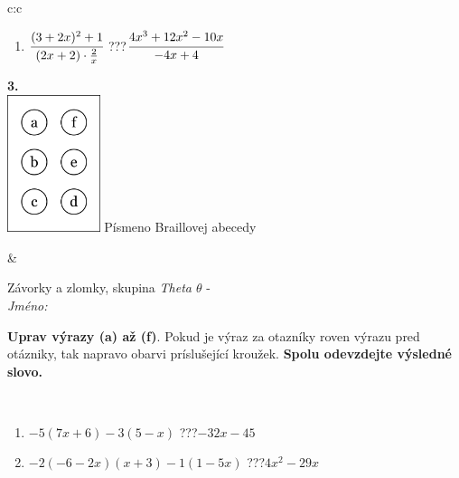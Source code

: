 \documentclass[10pt]{report}
\begin{document}
\begin{tabular}{c:c}
\begin{minipage}[c][104.5mm][t]{0.5\linewidth}
\begin{center}
\begin{minipage}{0.79\linewidth}
\begin{center}
\begin{varwidth}{\linewidth}
\begin{enumerate}
\item $\cfrac{(3+2x)^2+1}{(2x+2)\cdot\frac{2}{x}}$\quad \dotfill\; ???\;\dotfill \quad $\cfrac{4x^3+12x^2-10x}{-4x+4}$
\end{enumerate}
\end{varwidth}
\end{center}
\end{minipage}
\begin{minipage}{0.20\linewidth}
\begin{center}
{\Huge\bfseries 3.} \\[2mm]
\includegraphics[height=40mm]{../images/braille.png}
{\small Písmeno Braillovej abecedy}
\end{center}
\end{minipage}
\end{center}
\end{minipage}
&
\begin{minipage}[c][104.5mm][t]{0.5\linewidth}
\begin{center}
\vspace{7mm}
{\huge Závorky a zlomky, skupina \textit{Theta $\theta$} -}\\[5mm]
\textit{Jméno:}\phantom{xxxxxxxxxxxxxxxxxxxxxxxxxxxxxxxxxxxxxxxxxxxxxxxxxxxxxxxxxxxxxxxxx}\\[5mm]
\begin{minipage}{0.95\linewidth}
\begin{center}
\textbf{Uprav výrazy (a) až (f)}. Pokud je výraz za otazníky roven výrazu pred otázniky, tak napravo obarvi príslušející kroužek. \textbf{Spolu odevzdejte výsledné slovo.}
\end{center}
\end{minipage}
\\[1mm]
\begin{minipage}{0.79\linewidth}
\begin{center}
\begin{varwidth}{\linewidth}
\begin{enumerate}
\normalsize
\item $-5(7x+6)-3(5-x)$\quad \dotfill\; ???\;\dotfill \quad $-32x-45$
\item $-2(-6-2x)(x+3)-1(1-5x)$\quad \dotfill\; ???\;\dotfill \quad $4x^2-29x$

\end{enumerate}
\end{varwidth}
\end{center}
\end{minipage}
\end{center}
\end{minipage}
\end{tabular}
\end{document}
